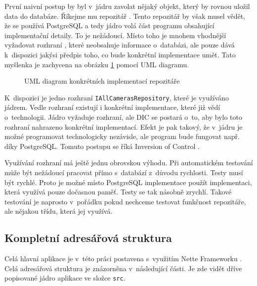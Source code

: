 První naivní postup by byl v~jádru zavolat nějaký objekt, který by rovnou uložil data do databáze. Říkejme mu repozitář \cite{repository}. Tento repozitář by však musel vědět, že se používá PostgreSQL a tedy jádro volá část programu obsahující implementační detaily. To je nežádoucí. Místo toho je mnohem vhodnější vyžadovat rozhraní \cite{php:interfaces}, které neobsahuje informace o~databázi, ale pouze dává k~dispozici jakýsi předpis toho, co bude konkrétní implementace umět. Tato myšlenka je zachycena na obrázku \ref{fig:hex2} pomocí UML diagramu.

\begin{figure}[h]
    \centering
	\caption{UML diagram konkrétních implementací repozitáře}
	\label{fig:hex2}
\end{figure}

K~dispozici je jedno rozhraní \texttt{IAllCamerasRepository}, které je vy\-u\-ží\-vá\-no jádrem. Vedle rozhraní existují i konkrétní implementace, které již vědí o~technologii. Jádro vyžaduje rozhraní, ale DIC se postará o~to, aby bylo toto rozhraní nahrazeno konkrétní implementací. Efekt je pak takový, že v~jádru je možné programovat technologicky nezávisle, ale program bude fungovat např. díky PostgreSQL. Tomuto postupu se říká Inversion of Control \cite{ioc}.

Využívání rozhraní má ještě jednu obrovskou výhodu. Při automatickém testování může být nežádoucí pracovat přímo s~databází z~důvodu rychlosti. Testy musí být rychlé. Proto je možné místo PostgreSQL implementace použít implementaci, která využívá pouze dočasnou paměť. Testy se tak násobně zrychlí. Takové testování je naprosto v~pořádku pokud nechceme testovat funkčnost repozitáře, ale nějakou třídu, která jej využívá.

\subsection{Kompletní adresářová struktura}
Celá hlavní aplikace je v~této práci postavena s~využitím Nette Frameworku \cite{netteorg}. Celá adresářová struktura je znázorněna v~následující části. Je zde vidět dříve popisované jádro aplikace ve složce \texttt{src}.

\vspace{1em}
\vspace{1em}

